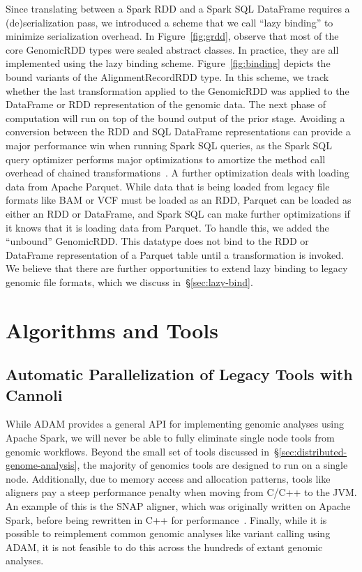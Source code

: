 \documentclass[phd]{ucbthesis}
\begin{document}
Since translating between a {Spark} RDD and a {Spark SQL}
DataFrame requires a (de)serialization pass, we introduced a scheme that we call
``lazy binding'' to minimize serialization overhead. In Figure~\ref{fig:grdd},
observe that most of the core {GenomicRDD} types were
sealed abstract classes. In practice, they are all implemented using the lazy
binding scheme. Figure~\ref{fig:binding} depicts the bound variants of the
{AlignmentRecordRDD} type. In this scheme, we track whether the last
transformation applied to the {GenomicRDD} was applied to the DataFrame
or RDD representation of the genomic data. The next phase of computation will
run on top of the bound output of the prior stage. Avoiding a conversion between the RDD and SQL DataFrame representations can provide a major
performance win when running {Spark SQL} queries, as the {Spark SQL}
query optimizer performs major optimizations to amortize the method call
overhead of chained transformations~\cite{armbrust15}. A further optimization
deals with loading data from {Apache Parquet}. While data that is being
loaded from legacy file formats like BAM or VCF must be loaded as an RDD,
{Parquet} can be loaded as either an RDD or DataFrame, and {Spark
  SQL} can make further optimizations if it knows that it is loading data from
{Parquet}. To handle this, we added the ``unbound'' {GenomicRDD}.
This datatype does not bind to the RDD or DataFrame representation of a
{Parquet} table until a transformation is invoked. We believe that there
are further opportunities to extend lazy binding to legacy genomic file formats,
which we discuss in~\S\ref{sec:lazy-bind}.

\part{Algorithms and Tools}

\chapter{Automatic Parallelization of Legacy Tools with {Cannoli}}
\label{chap:cannoli}

While {ADAM} provides a general API for implementing genomic analyses
using {Apache Spark}, we will never be able to fully eliminate single
node tools from genomic workflows. Beyond the small set of tools discussed
in~\S\ref{sec:distributed-genome-analysis}, the majority of genomics tools are
designed to run on a single node. Additionally, due to memory access and
allocation patterns, tools like aligners pay a steep performance penalty when
moving from C/C++ to the JVM. An example of this is the {SNAP} aligner,
which was originally written on {Apache Spark}, before being rewritten in
C++ for performance~\cite{zaharia11}. Finally, while it is possible to
reimplement common genomic analyses like variant calling using {ADAM}, it
is not feasible to do this across the hundreds of extant genomic analyses.
\end{document}
